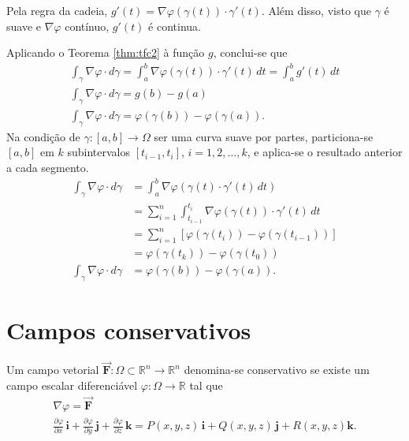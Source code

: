 \documentclass[11pt]{article}
\theoremstyle{definition}
\begin{document}
	Pela regra da cadeia, $g'(t)=\nabla \varphi(\gamma(t))\cdot \gamma'(t)$. Além disso, visto que $\gamma$ é suave e $\nabla \varphi$ contínuo, $g'(t)$ é continua.
	
	Aplicando o Teorema \ref{thm:tfc2} à função  $g$, conclui-se que
	\begin{gather*}
		\int_{\gamma}\nabla \varphi\cdot d\gamma=\int_{a}^{b} \nabla \varphi(\gamma(t))\cdot \gamma'(t)\, dt=\int_{a}^{b} g'(t)\, dt\\
		\int_{\gamma}\nabla \varphi\cdot d\gamma=g(b)-g(a)\\
		\int_{\gamma}\nabla \varphi\cdot d\gamma=\varphi(\gamma(b))-\varphi(\gamma(a)).
	\end{gather*}
	Na condição de $\gamma:[a,b]\to \Omega$ ser uma curva suave por partes, particiona-se $[a,b]$ em $k$ subintervalos $[t_{i-1},t_i]$, $i=1,2,\dots,k$, e aplica-se o resultado anterior a cada segmento.
	\begin{align*}
		\int_{\gamma} \nabla \varphi\cdot d\gamma&=\int_{a}^{b} \nabla \varphi(\gamma(t)\cdot \gamma'(t)\, dt)\\
		&=\sum_{i=1}^{n}\int_{t_{i-1}}^{t_i}\nabla \varphi(\gamma(t))\cdot \gamma'(t)\, dt\\
		&=\sum_{i=1}^{n}[\varphi(\gamma(t_i))-\varphi(\gamma(t_{i-1}))]\\
		&=\varphi(\gamma(t_k))-\varphi(\gamma(t_0))\\
		\int_{\gamma} \nabla \varphi\cdot d\gamma&=\varphi(\gamma(b))-\varphi(\gamma(a)).
	\end{align*}

	\section{Campos conservativos}
	
	Um campo vetorial $\vec{\boldsymbol{F}}:\Omega \subset \mathbb{R}^n \to \mathbb{R}^n$ denomina-se conservativo se existe um campo escalar diferenciável $\varphi:\Omega \to \mathbb{R}$ tal que
	\begin{gather*}
		\nabla \varphi=\vec{\boldsymbol{F}}\\
		\frac{\partial \varphi}{\partial x}\,\mathbf{i}+\frac{\partial \varphi}{\partial y}\,\mathbf{j}+\frac{\partial \varphi}{\partial z}\,\mathbf{k}=P(x,y,z)\,\mathbf{i}+Q(x,y,z)\,\mathbf{j}+R(x,y,z)\mathbf{k}.
	\end{gather*}
\end{document}
